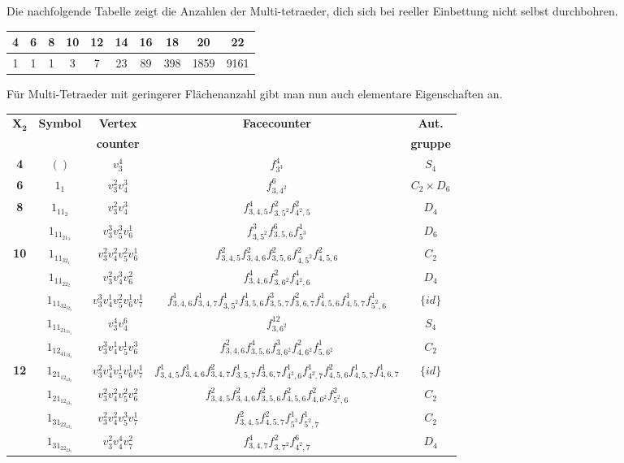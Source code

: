\documentclass[12pt,titlepage,twoside,cleardoublepage]{article}
\theoremstyle{nummermitklammern}
\numberwithin{equation}{section}
\begin{document}
Die nachfolgende Tabelle zeigt die Anzahlen der Multi-tetraeder, dich sich bei reeller Einbettung nicht selbst durchbohren.  
\begin{center}
\begin{tabular}{|c|c|c|c|c|c|c|c|c|c|}
\hline
\textbf{4}&\textbf{6}&\textbf{8}&\textbf{10}&\textbf{12}&\textbf{14}&\textbf{16}&\textbf{18}&\textbf{20}&\textbf{22}\\
\hline
1&1&1&3&7&23&89&398&1859&9161\\
\hline
\end{tabular}
\end{center}
Für Multi-Tetraeder mit geringerer Flächenanzahl gibt man nun auch elementare Eigenschaften an.

\begin{center}
\begin{tabular}[h]{|c|c|c|c|c|}
\hline
$\textbf{X}_{\textbf{2}}$ & \textbf{Symbol} & \textbf{Vertex}& \textbf{Facecounter} & \textbf{Aut.} \\
 &&\textbf{counter}&& \textbf{gruppe}\\
\hline
\textbf{4} & $()$ &$v_3^4$ & $f_{3^3}^4$ &$S_4$\\
\hline
\textbf{6} & $1_1$ & $v_3^2v_4^3$&$f^6_{3,4^2}$ &$C_2\times D_6$\\
\hline
\textbf{8} & $1_11_2$&$ v_3^2v_4^3$& $f^4_{3,4,5}f^2_{3,5^2}f^2_{4^2,5}$ & $D_4$\\
\hline  
  & $1_11_21_3$ & $v_3^3v_5^3v_6^1$& $f^3_{3,5^2}f^6_{3,5,6}f^1_{5^3}$ &$D_6$\\
\textbf{10}& $1_11_32_1$ &$v_3^2v_4^2v_5^2v_6^1$ & $f^2_{3,4,5}f^2_{3,4,6}f^2_{3,5,6}f^2_{4,5^2}f^2_{4,5,6}$ & $C_2$\\
  & $1_11_22_2$ &$v_3^2v_4^3v_6^2$& $f^4_{3,4,6}f^2_{3,6^2}f^4_{4^2,6}$ &$D_4$\\
\hline
  & $1_11_32_32_2$&$v_3^3v_4^1v_5^2v_6^1v_7^1$& $f^1_{3,4,6}f^1_{3,4,7}f^1_{3,5^2}f^1_{3,5,6}f^3_{3,5,7}f^2_{3,6,7}f^1_{4,5,6}f^1_{4,5,7}f^1_{5^2,6}$ &$\{id\}$\\
  & $1_11_21_31_4$& $v_3^4v_4^6$& $f^{12}_{3,6^2}$ &$S_4$\\
  & $1_12_41_32_2$&$v_3^3v_4^1v_5^1v_6^3$& $f^2_{3,4,6}f^4_{3,5,6}f^3_{3,6^2}f^2_{4,6^2}f^1_{5,6^2}$ & $C_2$\\
\textbf{12}& $1_21_12_43_2$&$v_3^2v_4^3v_5^1v_6^1v_7^1$& $f^1_{3,4,5}f^1_{3,4,6}f^2_{3,4,7}f^1_{3,5,7}f^1_{3,6,7}f^1_{4^2,6}f^1_{4^2,7}f^2_{4,5,6}f^1_{4,5,7}f^1_{4,6,7}$ &$\{id\}$\\
  & $1_21_12_43_3$& $v_3^2v_4^2v_5^2v_6^2$& $f^2_{3,4,5}f^2_{3,4,6}f^2_{3,5,6}f^2_{4,5,6}f^2_{4,6^2}f^2_{5^2,6}$&$C_2$\\
  & $1_31_22_43_4$& $v_3^2v_4^2v_5^3v_7^1$& $f^2_{3,4,5}f^2_{4,5,7}f^1_{5^3}f^1_{5^2,7}$&$C_2$\\
  & $1_31_22_23_3$& $v_3^2v_4^4v_7^2$&$f^4_{3,4,7}f^2_{3,7^2}f^6_{4^2,7}$ &$D_4$\\
 \hline
\end{tabular}
\end{center}
\end{document}
